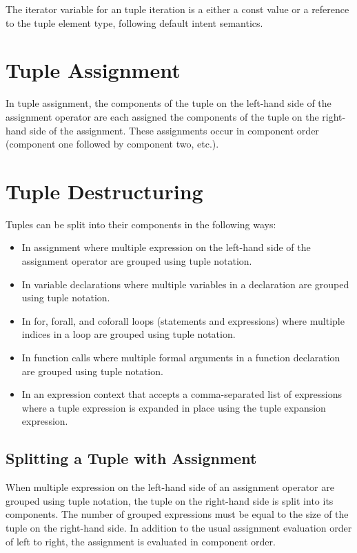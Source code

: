 The iterator variable for an tuple iteration is a either a const value
or a reference to the tuple element type, following default intent
semantics.

\section{Tuple Assignment}
\label{Tuple_Assignment}

In tuple assignment, the components of the tuple on the left-hand side
of the assignment operator are each assigned the components of the
tuple on the right-hand side of the assignment.  These assignments
occur in component order (component one followed by component two,
etc.).

\section{Tuple Destructuring}
\label{Tuple_Destructuring}

Tuples can be split into their components in the following ways:
\begin{itemize}
\item In assignment where multiple expression on the left-hand side of
the assignment operator are grouped using tuple notation.
\item In variable declarations where multiple variables in a
declaration are grouped using tuple notation.
\item In for, forall, and coforall loops (statements and expressions)
where multiple indices in a loop are grouped using tuple notation.
\item In function calls where multiple formal arguments in a function
declaration are grouped using tuple notation.
\item In an expression context that accepts a comma-separated list of
expressions where a tuple expression is expanded in place using the
tuple expansion expression.
\end{itemize}

\subsection{Splitting a Tuple with Assignment}
\label{Assignments_in_a_Tuple}

When multiple expression on the left-hand side of an assignment
operator are grouped using tuple notation, the tuple on the right-hand
side is split into its components.  The number of grouped expressions
must be equal to the size of the tuple on the right-hand side.  In
addition to the usual assignment evaluation order of left to right,
the assignment is evaluated in component order.

